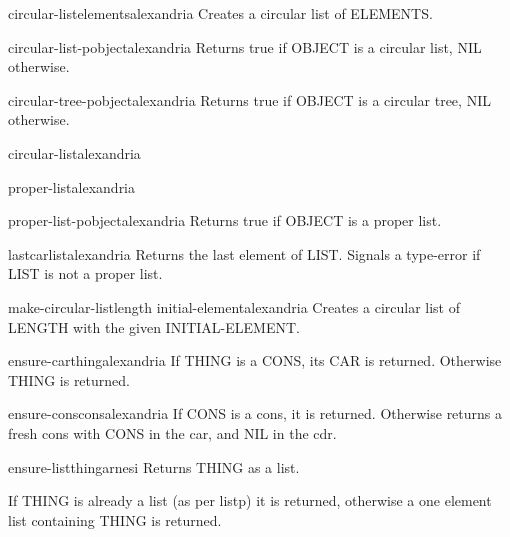 \begin{function}{circular-list}{\rest elements}{alexandria}{}
  Creates a circular list of ELEMENTS.
\end{function}

\begin{function}{circular-list-p}{object}{alexandria}{}
  Returns true if OBJECT is a circular list, NIL otherwise.
\end{function}

\begin{function}{circular-tree-p}{object}{alexandria}{}
  Returns true if OBJECT is a circular tree, NIL otherwise.
\end{function}

\begin{type}{circular-list}{}{alexandria}{}
  
\end{type}

\begin{type}{proper-list}{}{alexandria}{}
  
\end{type}

\begin{function}{proper-list-p}{object}{alexandria}{}
  Returns true if OBJECT is a proper list.
\end{function}

\begin{function}{lastcar}{list}{alexandria}{}
  Returns the last element of LIST. Signals a type-error if LIST is not a
proper list.
\end{function}

\begin{function}{make-circular-list}{length \key initial-element}{alexandria}{}
  Creates a circular list of LENGTH with the given INITIAL-ELEMENT.
\end{function}

\begin{function}{ensure-car}{thing}{alexandria}{}
  If THING is a CONS, its CAR is returned. Otherwise THING is returned.
\end{function}

\begin{function}{ensure-cons}{cons}{alexandria}{}
  If CONS is a cons, it is returned. Otherwise returns a fresh cons with CONS
  in the car, and NIL in the cdr.
\end{function}

\begin{function}{ensure-list}{thing}{arnesi}{}
  Returns THING as a list.

If THING is already a list (as per listp) it is returned,
otherwise a one element list containing THING is returned.
\end{function}

